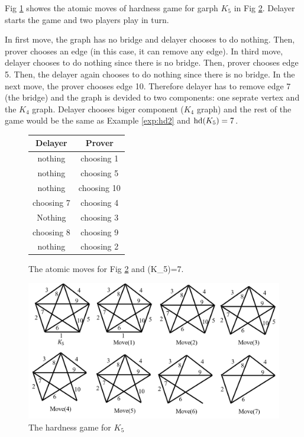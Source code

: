 \documentclass[]{book}
\begin{document}
\begin{examp}\label{exp:hd3}
       Fig \ref{fig:game3} showes the atomic moves of hardness game for garph $K_5$ in Fig \ref{fig:hd3}. Delayer starts the game and two 
	   players play in turn. 
	   
	   In first move, the graph has no bridge and delayer chooses to do nothing. Then, prover chooses an edge (in this case, it can remove 
	   any edge). In third move, delayer chooses to do nothing since there is no bridge. Then, prover chooses edge 5. Then, the delayer 
	   again chooses to do nothing since there is no bridge. In the next move, the prover chooses edge 10. Therefore delayer has to remove 
	   edge 7 (the bridge) and the graph is devided to two components: one seprate vertex and the $K_4$ graph. Delayer chooses biger component 
	   ($K_4$ graph) and the rest of the game would be the same as Example \ref{exp:hd2} and $\operatorname{hd}(K_5)=7$.
	 
	   \begin{figure}[h]
      \centering
      \begin{tabular}{|c|c|} 
      \hline
                  Delayer & Prover \\ \hline
                  nothing & choosing 1  \\ \hline
				  nothing & choosing 5  \\ \hline
				  nothing & choosing 10  \\ \hline
                  choosing 7 & choosing 4  \\ \hline
				  Nothing & choosing 3  \\ \hline
                  choosing 8 & choosing 9  \\ \hline
				  nothing & choosing 2  \\ \hline
      \end{tabular}
      \caption{The atomic moves for Fig \ref{fig:hd3} and \hardness(K_5)=7.}
      \label{fig:game3}
      \end{figure}
	  \begin{figure}
      \begin{center}
      \includegraphics[scale =0.6]{g3.png}
      \caption{The hardness game for $K_5$}
	  \label{fig:hd3}
      \end{center}
      \end{figure}
\end{examp}
\end{document}
